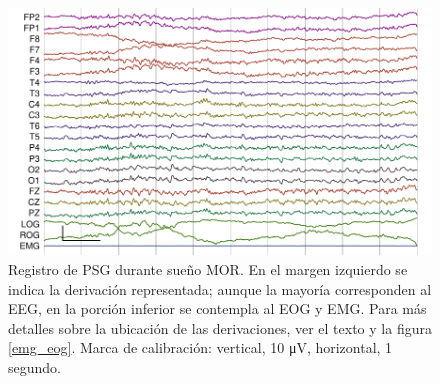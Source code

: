 \documentclass[12pt,letterpaper,draft]{book}
\newcommand{\mv}{\si{\micro\volt}\xspace}
\begin{document}
\begin{figure}
\centering
\includegraphics[width=\linewidth]
{./img_ejemplos/MJNN_epoca_stam.pdf}
\caption[Registro de polisomnograma durante sueño MOR]
{Registro de PSG durante sueño MOR. En el margen izquierdo se indica la derivación representada; aunque la mayoría corresponden al EEG, en la porción inferior se contempla al EOG y EMG.
Para más detalles sobre la ubicación de las derivaciones, ver el texto y la figura \ref{emg_eog}. Marca de calibración: vertical, 10 \mv, horizontal, 1 segundo.}
\label{ejemplos_mor}
\end{figure}

\end{document}
